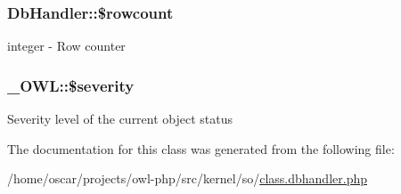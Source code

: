 \subsubsection[{\$rowcount}]{\setlength{\rightskip}{0pt plus 5cm}DbHandler::\$rowcount}\label{classDbHandler_a56a7ae4bd7d842c85f3fe8052aecbfef}
integer -\/ Row counter 
\subsubsection[{\$severity}]{\setlength{\rightskip}{0pt plus 5cm}\_\-OWL::\$severity}\label{class__OWL_ad26b40a9dbbacb33e299b17826f8327c}
Severity level of the current object status 

The documentation for this class was generated from the following file:\begin{DoxyCompactItemize}
\item 
/home/oscar/projects/owl-\/php/src/kernel/so/\hyperlink{class_8dbhandler_8php}{class.dbhandler.php}\end{DoxyCompactItemize}
